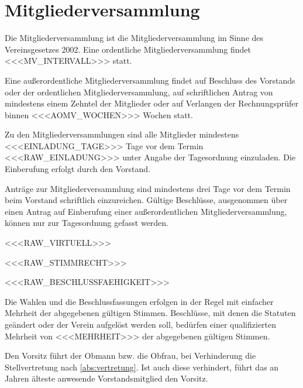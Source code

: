 \documentclass[a4paper,11pt]{article}
\begin{document}
\section{Mitgliederversammlung}\label{par:mv}
\begin{absaetze}
  \item Die Mitgliederversammlung ist die \glqq{}Mitgliederversammlung\grqq{} im Sinne des Vereinsgesetzes 2002. Eine
        ordentliche Mitgliederversammlung findet <<<MV_INTERVALL>>> statt.
  \item Eine außerordentliche Mitgliederversammlung findet auf Beschluss des Vorstands oder der ordentlichen
        Mitgliederversammlung, auf schriftlichen Antrag von mindestens einem Zehntel der Mitglieder oder auf
        Verlangen der Rechnungsprüfer binnen <<<AOMV_WOCHEN>>> Wochen statt.\label{abs:aomv}
  \item Zu den Mitgliederversammlungen sind alle Mitglieder mindestens <<<EINLADUNG_TAGE>>> Tage vor dem Termin
        <<<RAW_EINLADUNG>>> unter Angabe der Tagesordnung einzuladen. Die Einberufung erfolgt durch den Vorstand.
  \item Anträge zur Mitgliederversammlung sind mindestens drei Tage vor dem Termin beim Vorstand schriftlich
        einzureichen. Gültige Beschlüsse, ausgenommen über einen Antrag auf Einberufung einer außerordentlichen
        Mitgliederversammlung, können nur zur Tagesordnung gefasst werden.
  \item <<<RAW_VIRTUELL>>>
  \item <<<RAW_STIMMRECHT>>>
  \item <<<RAW_BESCHLUSSFAEHIGKEIT>>>
  \item Die Wahlen und die Beschlussfassungen erfolgen in der Regel mit einfacher Mehrheit der abgegebenen gültigen
        Stimmen. Beschlüsse, mit denen die Statuten geändert oder der Verein aufgelöst werden soll, bedürfen einer
        qualifizierten Mehrheit von <<<MEHRHEIT>>> der abgegebenen gültigen Stimmen.\label{abs:mehrheit}
  \item Den Vorsitz führt der Obmann bzw. die Obfrau, bei Verhinderung die Stellvertretung nach
        \ref{abs:vertretung}. Ist auch diese verhindert, führt das an Jahren älteste anwesende Vorstandsmitglied den
        Vorsitz.
\end{absaetze}

\end{document}
